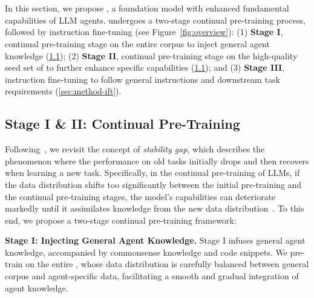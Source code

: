 \section{\method}
\label{sec:method}

In this section, we propose \method, a foundation model with enhanced fundamental capabilities of LLM agents.
\method undergoes a two-stage continual pre-training process, followed by instruction fine-tuning (see Figure~\ref{fig:overview}):
(1) \textbf{Stage I}, continual pre-training stage on the entire \dataset corpus to inject general agent knowledge (\cref{sec:method-pre});
(2) \textbf{Stage II}, continual pre-training stage on the high-quality seed set of \dataset to further enhance specific capabilities (\cref{sec:method-pre}); and
(3) \textbf{Stage III}, instruction fine-tuning to follow general instructions and downstream task requirements (\cref{sec:method-ift}).


\subsection{Stage I \& II: Continual Pre-Training}
\label{sec:method-pre}
Following~\citet{caccia2022new, lange2023continual}, we revisit the concept of \emph{stability gap}, which describes the phenomenon where the performance on old tasks initially drops and then recovers when learning a new task.
Specifically, in the continual pre-training of LLMs, if the data distribution shifts too significantly between the initial pre-training and the continual pre-training stages, the model's capabilities can deteriorate markedly until it assimilates knowledge from the new data distribution~\cite{guo2024efficient}.
To this end, we propose a two-stage continual pre-training framework:

\noindent \textbf{Stage I: Injecting General Agent Knowledge.}  
Stage I infuses general agent knowledge, accompanied by commonsense knowledge and code snippets. We pre-train \method on the entire \dataset, whose data distribution is carefully balanced between general corpus and agent-specific data, facilitating a smooth and gradual integration of agent knowledge.

